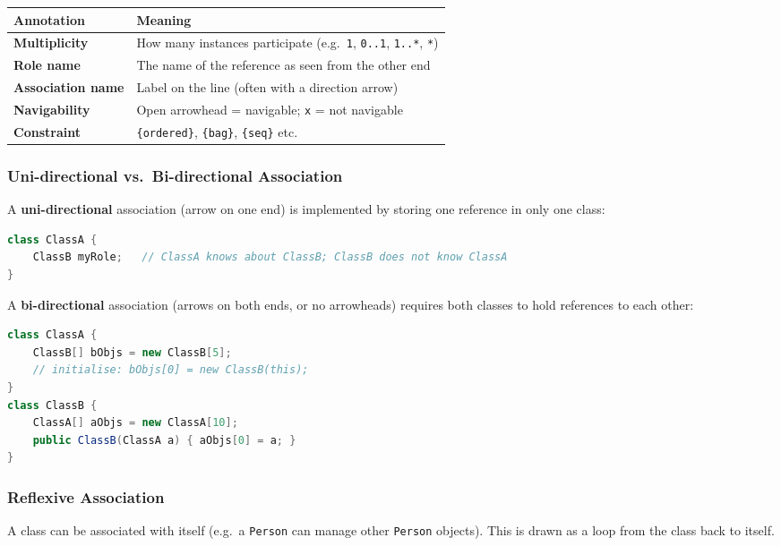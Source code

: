 \documentclass[11pt, a4paper, notitlepage]{report}
\theoremstyle{definition}
\theoremstyle{remark}
\theoremstyle{definition}
\begin{document}
\begin{center}
\begin{tabular}{@{}ll@{}}
  \toprule
  Annotation & Meaning \\
  \midrule
  \textbf{Multiplicity} & How many instances participate (e.g.\ \texttt{1}, \texttt{0..1}, \texttt{1..*}, \texttt{*}) \\
  \textbf{Role name} & The name of the reference as seen from the other end \\
  \textbf{Association name} & Label on the line (often with a direction arrow) \\
  \textbf{Navigability} & Open arrowhead = navigable; \texttt{x} = not navigable \\
  \textbf{Constraint} & \texttt{\{ordered\}}, \texttt{\{bag\}}, \texttt{\{seq\}} etc. \\
  \bottomrule
\end{tabular}
\end{center}

\subsubsection{Uni-directional vs.\ Bi-directional Association}

A \textbf{uni-directional} association (arrow on one end) is implemented by
storing one reference in only one class:

\begin{lstlisting}[language=Java,caption={Uni-directional association}]
class ClassA {
    ClassB myRole;   // ClassA knows about ClassB; ClassB does not know ClassA
}
\end{lstlisting}

A \textbf{bi-directional} association (arrows on both ends, or no
arrowheads) requires both classes to hold references to each other:

\begin{lstlisting}[language=Java,caption={Bi-directional association}]
class ClassA {
    ClassB[] bObjs = new ClassB[5];
    // initialise: bObjs[0] = new ClassB(this);
}
class ClassB {
    ClassA[] aObjs = new ClassA[10];
    public ClassB(ClassA a) { aObjs[0] = a; }
}
\end{lstlisting}

\subsubsection{Reflexive Association}

A class can be associated with itself (e.g.\ a \texttt{Person} can manage
other \texttt{Person} objects).  This is drawn as a loop from the class back
to itself.
\end{document}
